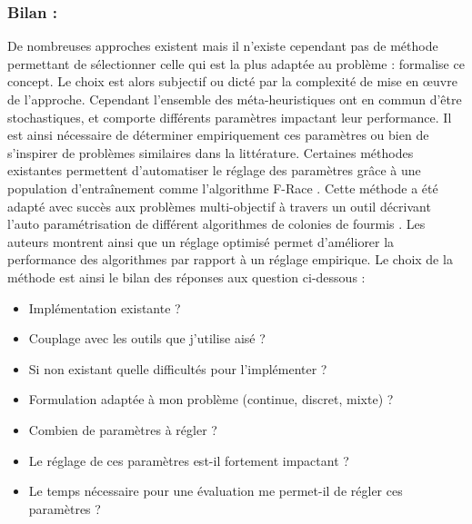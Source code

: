 \subsubsection{Bilan :} %
\label{ssub:bilan}
De nombreuses approches existent mais il n’existe cependant pas de méthode permettant de
sélectionner celle qui est la plus adaptée au problème : \cite{Wolpert199767} formalise
ce concept. Le choix est alors subjectif ou dicté par la complexité de mise en œuvre
de l’approche.
Cependant l’ensemble des méta-heuristiques ont en commun d’être stochastiques, et comporte
différents paramètres impactant leur performance.
Il est ainsi nécessaire de déterminer empiriquement ces paramètres ou bien de s’inspirer
de problèmes similaires dans la littérature.
Certaines méthodes existantes permettent d’automatiser le réglage des
paramètres grâce à une population d’entraînement comme l’algorithme F-Race \parencite{Birattari2010311}.
Cette méthode a été adapté avec succès aux problèmes multi-objectif à travers un outil
décrivant l’auto paramétrisation de différent algorithmes de colonies de fourmis \parencite{Lopez-Ibanez2012861}.
Les auteurs montrent ainsi que un réglage optimisé permet d’améliorer la performance
des algorithmes par rapport à un réglage empirique.
Le choix de la méthode est ainsi le bilan des réponses aux question ci-dessous :
\begin{itemize}
  \item Implémentation existante ?
  \item Couplage avec les outils que j’utilise aisé ?
  \item Si non existant quelle difficultés pour l’implémenter ?
  \item Formulation adaptée à mon problème (continue, discret, mixte) ?
  \item Combien de paramètres à régler ?
  \item Le réglage de ces paramètres est-il fortement impactant ?
  \item Le temps nécessaire pour une évaluation me permet-il de régler ces paramètres ?
\end{itemize}



